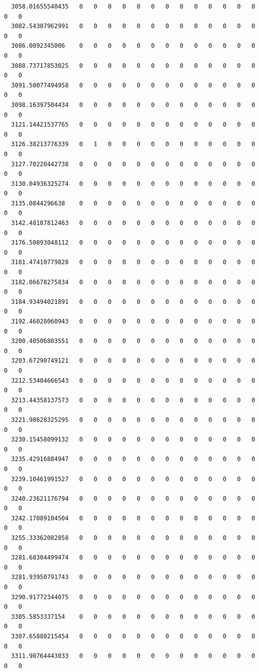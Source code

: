 \documentclass[
  letterpaper,
  DIV=11,
  numbers=noendperiod]{scrartcl}
\begin{document}
\begin{verbatim}
  3058.01655540435   0   0   0   0   0   0   0   0   0   0   0   0   0   0   0
  3082.54307962991   0   0   0   0   0   0   0   0   0   0   0   0   0   0   0
  3086.0092345006    0   0   0   0   0   0   0   0   0   0   0   0   0   0   0
  3088.73717853025   0   0   0   0   0   0   0   0   0   0   0   0   0   0   0
  3091.50077494958   0   0   0   0   0   0   0   0   0   0   0   0   0   0   0
  3098.16397504434   0   0   0   0   0   0   0   0   0   0   0   0   0   0   0
  3121.14421537765   0   0   0   0   0   0   0   0   0   0   0   0   0   0   0
  3126.38213776339   0   1   0   0   0   0   0   0   0   0   0   0   0   0   0
  3127.70220442738   0   0   0   0   0   0   0   0   0   0   0   0   0   0   0
  3130.04936325274   0   0   0   0   0   0   0   0   0   0   0   0   0   0   0
  3135.0844296638    0   0   0   0   0   0   0   0   0   0   0   0   0   0   0
  3142.48187812463   0   0   0   0   0   0   0   0   0   0   0   0   0   0   0
  3176.50893048112   0   0   0   0   0   0   0   0   0   0   0   0   0   0   0
  3181.47410779828   0   0   0   0   0   0   0   0   0   0   0   0   0   0   0
  3182.06678275834   0   0   0   0   0   0   0   0   0   0   0   0   0   0   0
  3184.93494021891   0   0   0   0   0   0   0   0   0   0   0   0   0   0   0
  3192.46028060943   0   0   0   0   0   0   0   0   0   0   0   0   0   0   0
  3200.40506803551   0   0   0   0   0   0   0   0   0   0   0   0   0   0   0
  3203.67290749121   0   0   0   0   0   0   0   0   0   0   0   0   0   0   0
  3212.53404666543   0   0   0   0   0   0   0   0   0   0   0   0   0   0   0
  3213.44358137573   0   0   0   0   0   0   0   0   0   0   0   0   0   0   0
  3221.98628325295   0   0   0   0   0   0   0   0   0   0   0   0   0   0   0
  3230.15458099132   0   0   0   0   0   0   0   0   0   0   0   0   0   0   0
  3235.42916884947   0   0   0   0   0   0   0   0   0   0   0   0   0   0   0
  3239.10461991527   0   0   0   0   0   0   0   0   0   0   0   0   0   0   0
  3240.23621176794   0   0   0   0   0   0   0   0   0   0   0   0   0   0   0
  3242.17089104504   0   0   0   0   0   0   0   0   0   0   0   0   0   0   0
  3255.33362082858   0   0   0   0   0   0   0   0   0   0   0   0   0   0   0
  3281.68304499474   0   0   0   0   0   0   0   0   0   0   0   0   0   0   0
  3281.93950791743   0   0   0   0   0   0   0   0   0   0   0   0   0   0   0
  3290.91772344075   0   0   0   0   0   0   0   0   0   0   0   0   0   0   0
  3305.5853337154    0   0   0   0   0   0   0   0   0   0   0   0   0   0   0
  3307.65880215454   0   0   0   0   0   0   0   0   0   0   0   0   0   0   0
  3311.90764443033   0   0   0   0   0   0   0   0   0   0   0   0   0   0   0
                  

\end{verbatim}
\end{document}
